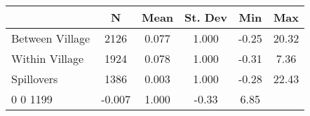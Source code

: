 \begin{tabular}{l*{5}{c}}\hline&\multicolumn{1}{c}{N}&\multicolumn{1}{c}{Mean}&\multicolumn{1}{c}{St. Dev}&\multicolumn{1}{c}{Min}&\multicolumn{1}{c}{Max}\\ \hline 
Between Village & 2126 & 0.077 & 1.000 & -0.25 & 20.32 \\
Within Village & 1924 & 0.078 & 1.000 & -0.31 & 7.36 \\
Spillovers & 1386 & 0.003 & 1.000 & -0.28 & 22.43 \\
0 0 1199 & -0.007 & 1.000 & -0.33 & 6.85 \\
\hline \end{tabular}
